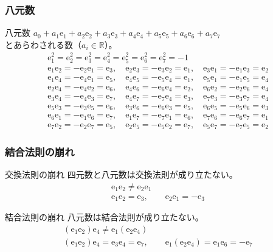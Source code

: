 \documentclass{beamer}
\newcommand{\ee}{\mathrm{e}}
\begin{document}
\begin{frame}
    \frametitle{八元数}

    \begin{block}{八元数}
        \(a_0 + a_1 \ee_1 + a_2 \ee_2 + a_3 \ee_3 + a_4 \ee_4 + a_5 \ee_5 + a_6 \ee_6 + a_7 \ee_7\) \\
        とあらわされる数（\(a_i \in \mathbb{R}\)）。
        \begin{gather*}
            \ee_1^2 = \ee_2^2 = \ee_3^2 = \ee_4^2 = \ee_5^2 = \ee_6^2 = \ee_7^2 = -1 \\
            \ee_1 \ee_2 = -\ee_2 \ee_1 = \ee_3, \quad \ee_2 \ee_3 = -\ee_3 \ee_2 = \ee_1, \quad \ee_3 \ee_1 = -\ee_1 \ee_3 = \ee_2 \\
            \ee_1 \ee_4 = -\ee_4 \ee_1 = \ee_5, \quad \ee_4 \ee_5 = -\ee_5 \ee_4 = \ee_1, \quad \ee_5 \ee_1 = -\ee_1 \ee_5 = \ee_4 \\
            \ee_2 \ee_4 = -\ee_4 \ee_2 = \ee_6, \quad \ee_4 \ee_6 = -\ee_6 \ee_4 = \ee_2, \quad \ee_6 \ee_2 = -\ee_2 \ee_6 = \ee_4 \\
            \ee_3 \ee_4 = -\ee_4 \ee_3 = \ee_7, \quad \ee_4 \ee_7 = -\ee_7 \ee_4 = \ee_3, \quad \ee_7 \ee_3 = -\ee_3 \ee_7 = \ee_4 \\
            \ee_5 \ee_3 = -\ee_3 \ee_5 = \ee_6, \quad \ee_3 \ee_6 = -\ee_6 \ee_3 = \ee_5, \quad \ee_6 \ee_5 = -\ee_5 \ee_6 = \ee_3 \\
            \ee_6 \ee_1 = -\ee_1 \ee_6 = \ee_7, \quad \ee_1 \ee_7 = -\ee_7 \ee_1 = \ee_6, \quad \ee_7 \ee_6 = -\ee_6 \ee_7 = \ee_1 \\
            \ee_7 \ee_2 = -\ee_2 \ee_7 = \ee_5, \quad \ee_2 \ee_5 = -\ee_5 \ee_2 = \ee_7, \quad \ee_5 \ee_7 = -\ee_7 \ee_5 = \ee_2
        \end{gather*}
    \end{block}
\end{frame}

\begin{frame}
    \frametitle{結合法則の崩れ}

    \begin{block}{交換法則の崩れ}
        四元数と八元数は交換法則が成り立たない。
        \begin{gather*}
            \ee_1 \ee_2 \neq \ee_2 \ee_1 \\
            \ee_1 \ee_2 = \ee_3, \qquad \ee_2 \ee_1 = - \ee_3
        \end{gather*}
    \end{block}

    \begin{block}{結合法則の崩れ}
        八元数は結合法則が成り立たない。
        \begin{gather*}
            (\ee_1 \ee_2) \ee_4 \neq \ee_1 (\ee_2 \ee_4) \\
            (\ee_1 \ee_2) \ee_4 = \ee_3 \ee_4 = \ee_7, \qquad \ee_1 (\ee_2 \ee_4) = \ee_1 \ee_6 = - \ee_7
        \end{gather*}
    \end{block}
\end{frame}
\end{document}
